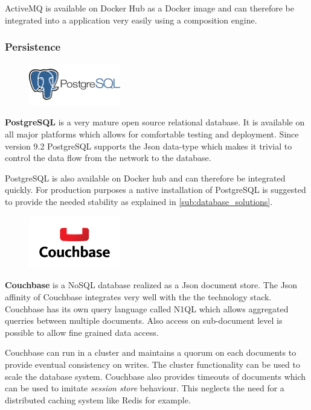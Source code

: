 ActiveMQ is available on Docker Hub as a Docker image and can therefore
be integrated into a \ms{} application very easily using a composition engine.


\subsubsection{Persistence}

\begin{figure}
 	\hspace*{0.4cm}
    \includegraphics[width=4cm]{images/dependencies/PostgreSQL}
\end{figure}

\textbf{PostgreSQL} is a very mature open source relational database. It is
available on all major platforms which allows for comfortable testing and
deployment. Since version 9.2 PostgreSQL supports the Json data-type which makes
it trivial to control the data flow from the network to the database.

PostgreSQL is also available on Docker hub and can therefore be integrated
quickly. For production purposes a native installation of PostgreSQL is
suggested to provide the needed stability as explained in
\autoref{sub:database_solutions}.\\ 


\begin{figure}
    \includegraphics[width=4cm]{images/dependencies/couchbase}
\end{figure}

\noindent
\textbf{Couchbase} is a NoSQL database realized as a Json document store. The
Json affinity of Couchbase integrates very well with the the technology stack.
Couchbase has its own query language called N1QL which allows aggregated
querries between multiple documents. Also access on sub-document level is
possible to allow fine grained data access.

Couchbase can run in a cluster and maintains a quorum on each documents to
provide eventual consistency on writes. The cluster functionality can be used to
scale the database system. Couchbase also provides timeouts of documents which
can be used to imitate \textit{session store} behaviour. This neglects the need
for a distributed caching system like Redis for example.

